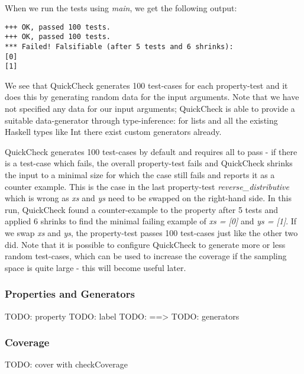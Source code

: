 When we run the tests using \textit{main}, we get the following output:

\begin{verbatim}
+++ OK, passed 100 tests.
+++ OK, passed 100 tests.
*** Failed! Falsifiable (after 5 tests and 6 shrinks):    
[0]
[1]
\end{verbatim}

We see that QuickCheck generates 100 test-cases for each property-test and it does this by generating random data for the input arguments. Note that we have not specified any data for our input arguments; QuickCheck is able to provide a suitable data-generator through type-inference: for lists and all the existing Haskell types like Int there exist custom generators already.

QuickCheck generates 100 test-cases by default and requires all to pass - if there is a test-case which fails, the overall property-test fails and QuickCheck shrinks the input to a minimal size for which the case still fails and reports it as a counter example. This is the case in the last property-test \textit{reverse\_distributive} which is wrong as \textit{xs} and \textit{ys} need to be swapped on the right-hand side. In this run, QuickCheck found a counter-example to the property after 5 tests and applied 6 shrinks to find the minimal failing example of \textit{xs = [0]} and \textit{ys = [1]}. If we swap \textit{xs} and \textit{ys}, the property-test passes 100 test-cases just like the other two did. Note that it is possible to configure QuickCheck to generate more or less random test-cases, which can be used to increase the coverage if the sampling space is quite large - this will become useful later.

\subsubsection*{Properties and Generators}
TODO: property
TODO: label
TODO: ==>
TODO: generators

\subsubsection*{Coverage}
TODO: cover with checkCoverage
